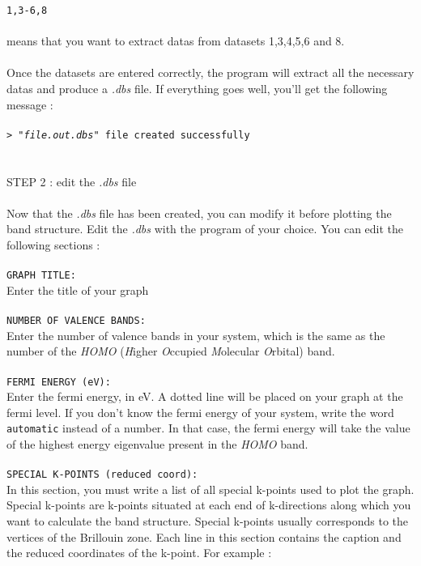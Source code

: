 \documentclass[prl]{article}
\begin{document}
\texttt{1,3-6,8} \\
\\
means that you want to extract datas from datasets 1,3,4,5,6 and 8. \\
\\
Once the datasets are entered correctly, the program will extract all the necessary datas and produce a \textit{.dbs} file. If everything goes well, you'll get the following message : \\
\\
\texttt{> "\textit{file.out.dbs}"  file created successfully} \\
\\
\\
{\large{STEP 2 : edit the \textit{.dbs} file}} \\
\\
Now that the \textit{.dbs} file has been created, you can modify it before plotting the band structure. Edit the \textit{.dbs} with the program of your choice.
You can edit the following sections : \\
\\
\texttt{GRAPH TITLE:} \\
Enter the title of your graph \\
\\
\texttt{NUMBER OF VALENCE BANDS:} \\
Enter the number of valence bands in your system, which is the same as the number of the \textit{HOMO} (\textit{H}igher \textit{O}ccupied \textit{M}olecular \textit{O}rbital) band. \\
\\
\texttt{FERMI ENERGY (eV):} \\
Enter the fermi energy, in eV. A dotted line will be placed on your graph at the fermi level. If you don't know the fermi energy of your system, write the word \texttt{automatic} instead of a number. In that case, the fermi energy will take the value of the highest energy eigenvalue present in the \textit{HOMO} band. \\
\\
\texttt{SPECIAL K-POINTS (reduced coord):} \\
In this section, you must write a list of all special k-points used to plot the graph. Special k-points are k-points situated at each end of k-directions along which you want to calculate the band structure. Special k-points usually corresponds to the vertices of the Brillouin zone. Each line in this section contains the caption and the reduced coordinates of the k-point. For example : \\
\end{document}
